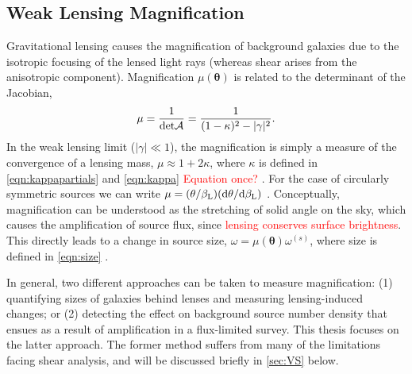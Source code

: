 
\subsection{Weak Lensing Magnification}
\label{sec:Mag}

Gravitational lensing causes the magnification of background galaxies due to the isotropic focusing of the lensed light rays (whereas shear arises from the anisotropic component). Magnification $\mu(\bm{\theta})$ is related to the determinant of the Jacobian, 
\begin{equation}
\mu  = \frac{1}{{\rm det}{\cal A}} = \frac{1}{(1-\kappa)^2 - |\gamma|^2}.
\end{equation}
In the weak lensing limit ($|\gamma| \ll 1$), the magnification is simply a measure of the convergence of a lensing mass, $\mu \approx 1+2\kappa$, where $\kappa$ is defined in \autoref{eqn:kappapartials} and \autoref{eqn:kappa} \textcolor{red}{Equation once?} \citep{Schneider06_IntroGravLensCosmology}. For the case of circularly symmetric sources we can write $\mu = (\theta/\beta_{\rm L})({\rm d}\theta/{\rm d}\beta_{\rm L})$
\citep{NarayanBartelmann96}. Conceptually, magnification can be understood as the stretching of solid angle on the sky, which causes the amplification of source flux, since \textcolor{red}{lensing conserves surface brightness}. This directly leads to a change in source size, $\omega = \mu(\bm{\theta}) \omega^{(s)}$, where size is defined in \autoref{eqn:size} \citep{BS01}.

In general, two different approaches can be taken to measure magnification: (1) quantifying sizes of galaxies behind lenses and measuring lensing-induced changes; or (2) detecting the effect on background source number density that ensues as a result of amplification in a flux-limited survey. This thesis focuses on the latter approach. The former method suffers from many of the limitations facing shear analysis, and will be discussed briefly in \autoref{sec:VS} below. 

